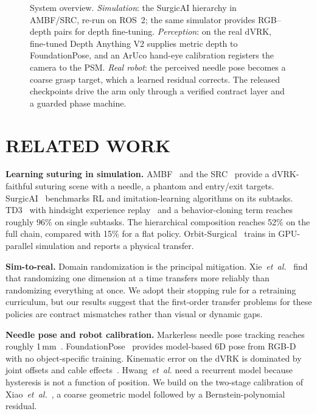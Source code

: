 \documentclass[letterpaper, 10 pt, conference]{ieeeconf}  %
\begin{document}
\begin{figure}[t]
  \centering
  \resizebox{\textwidth}{!}{}
  \caption{System overview. \emph{Simulation}: the SurgicAI hierarchy in
  AMBF/SRC, re-run on ROS~2; the same simulator provides RGB--depth pairs for
  depth fine-tuning. \emph{Perception}: on the real dVRK, fine-tuned Depth
  Anything V2 supplies metric depth to FoundationPose, and an ArUco hand-eye
  calibration registers the camera to the PSM. \emph{Real robot}: the perceived
  needle pose becomes a coarse grasp target, which a learned residual corrects.
  The released checkpoints drive the arm only through a verified contract layer
  and a guarded phase machine.}
  \label{fig:overview}
\end{figure}


\section{RELATED WORK}

\textbf{Learning suturing in simulation.} AMBF~\cite{munawar2019ambf} and the
SRC~\cite{munawar2022src} provide a dVRK-faithful suturing scene with a needle,
a phantom and entry/exit targets. SurgicAI~\cite{wu2024surgicai} benchmarks RL
and imitation-learning algorithms on its subtasks. TD3~\cite{fujimoto2018td3}
with hindsight experience replay~\cite{andrychowicz2017her} and a
behavior-cloning term reaches roughly 96\% on single subtasks. The hierarchical
composition reaches 52\% on the full chain, compared with 15\% for a flat policy.
Orbit-Surgical~\cite{yu2024orbit} trains in GPU-parallel simulation and reports
a physical transfer.

\textbf{Sim-to-real.} Domain randomization is the principal mitigation.
Xie~\emph{et~al.}~\cite{xie2022randomization} find that randomizing one
dimension at a time transfers more reliably than randomizing everything at once.
We adopt their stopping rule for a retraining curriculum, but our results
suggest that the first-order transfer problems for these policies are contract
mismatches rather than visual or dynamic gaps.

\textbf{Needle pose and robot calibration.} Markerless needle pose tracking
reaches roughly 1\,mm~\cite{chiu2022needle}. FoundationPose~\cite{wen2024foundationpose}
provides model-based 6D pose from RGB-D with no object-specific training.
Kinematic error on the dVRK is dominated by joint offsets and cable
effects~\cite{hwang2020calibrating}. Hwang~\emph{et~al.} need a recurrent model
because hysteresis is not a function of position. We build on the two-stage
calibration of Xiao~\emph{et~al.}~\cite{xiao2022delta}, a coarse geometric
model followed by a Bernstein-polynomial residual.
\end{document}
